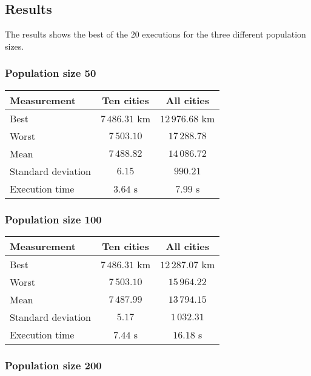 \documentclass{article}
\begin{document}
\subsection*{Results}

The results shows the best of the 20 executions for the three different population sizes.

\subsubsection*{Population size 50}

\begin{center}
\begin{tabular}{lcc}
\toprule
Measurement & Ten cities & All cities \\
\midrule
Best & $7\,486.31$ km & $12\,976.68$ km \\
Worst & $7\,503.10$ & $17\,288.78$ \\
Mean & $7\,488.82$ & $14\,086.72$ \\
Standard deviation & $6.15$ & $990.21$ \\
Execution time & $3.64$ s & $7.99$ s \\
\bottomrule
\end{tabular}
\end{center}

\subsubsection*{Population size 100}

\begin{center}
\begin{tabular}{lcc}
\toprule
Measurement & Ten cities & All cities \\
\midrule
Best & $7\,486.31$ km & $12\,287.07$ km \\
Worst & $7\,503.10$ & $15\,964.22$ \\
Mean & $7\,487.99$ & $13\,794.15$ \\
Standard deviation & $5.17$ & $1\,032.31$ \\
Execution time & $7.44$ s & $16.18$ s \\
\bottomrule
\end{tabular}
\end{center}

\subsubsection*{Population size 200}
\end{document}
